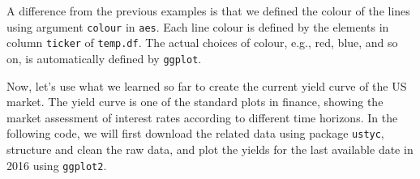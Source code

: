 \documentclass[11pt,]{book}
\begin{document}
A difference from the previous examples is that we defined the colour of
the lines using argument \texttt{colour} in \texttt{aes}. Each line
colour is defined by the elements in column \texttt{ticker} of
\texttt{temp.df}. The actual choices of colour, e.g., red, blue, and so
on, is automatically defined by \texttt{ggplot}.

Now, let's use what we learned so far to create the current yield curve
of the US market. The yield curve is one of the standard plots in
finance, showing the market assessment of interest rates according to
different time horizons. In the following code, we will first download
the related data using package \texttt{ustyc}, structure and clean the
raw data, and plot the yields for the last available date in 2016 using
\texttt{ggplot2}. 
\end{document}
